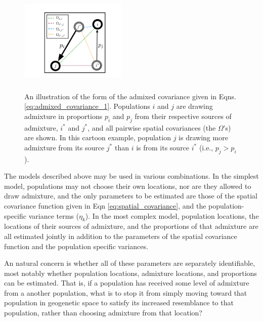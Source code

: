 \documentclass[12pt]{article}
\newcommand{\identifyadmixsource}[1]{{#1^{*}}}
\begin{document}
\begin{figure}[ht!]
	\centering
	\includegraphics[width=2in,height=2in]{figs/admix_cov_fig.pdf}
	\caption{An illustration of the form of the admixed covariance given in Eqns. \eqref{eq:admixed_covariance_1}.  Populations $i$ and $j$ are drawing admixture in proportions $p_i$ and $p_j$ from their respective sources of admixture, $\identifyadmixsource{i}$ and $\identifyadmixsource{j}$, and all pairwise spatial covariances (the $\Omega$'s) are shown.  In this cartoon example, population $j$ is drawing more admixture from its source $\identifyadmixsource{j}$ than $i$ is from its source $\identifyadmixsource{i}$ (i.e., $p_j > p_i$).}
\label{sfig:admixed_cov_diagram}
\end{figure}


The models described above may be used in various combinations.  In the simplest model, populations may not choose their own locations, nor are they allowed to draw admixture, and the only parameters to be estimated are those of the spatial covariance function given in Eqn \eqref{eq:spatial_covariance}, and the population-specific variance terms ($\eta_k$).  In the most complex model, population locations, the locations of their sources of admixture, and the proportions of that admixture are all estimated jointly in addition to the parameters of the spatial covariance function and the population specific variances.  

An natural concern is whether all of these parameters are separately identifiable, most notably whether population locations, admixture locations, and proportions can be estimated. That is, if a population has received some level of admixture from a another population, what is to stop it from simply moving toward that population in geogenetic space to satisfy its increased resemblance to that population, rather than choosing admixture from that location?
\end{document}

